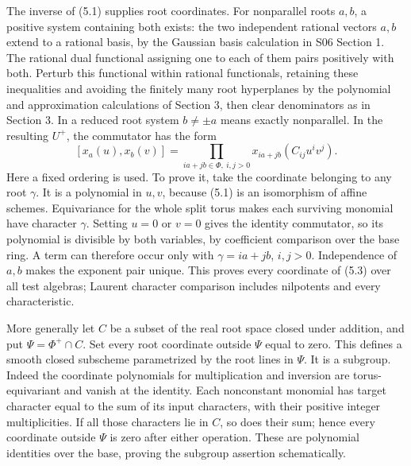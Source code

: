 \documentclass[11pt,a4paper,openany]{report}
\begin{document}
The inverse of (5.1) supplies root coordinates. For nonparallel roots \(a,b\), a positive system containing both exists: the two independent rational vectors \(a,b\) extend to a rational basis, by the Gaussian basis calculation in S06 Section 1. The rational dual functional assigning one to each of them pairs positively with both. Perturb this functional within rational functionals, retaining these inequalities and avoiding the finitely many root hyperplanes by the polynomial and approximation calculations of Section 3, then clear denominators as in Section 3. In a reduced root system \(b\ne\pm a\) means exactly nonparallel. In the resulting \(U^+\), the commutator has the form \[
 [x_a(u),x_b(v)]
       =\prod_{ia+jb\in\Phi,\ i,j>0}
                          x_{ia+jb}(C_{ij}u^iv^j).
\tag{5.3}
\] Here a fixed ordering is used. To prove it, take the coordinate belonging to any root \(\gamma\). It is a polynomial in \(u,v\), because (5.1) is an isomorphism of affine schemes. Equivariance for the whole split torus makes each surviving monomial have character \(\gamma\). Setting \(u=0\) or \(v=0\) gives the identity commutator, so its polynomial is divisible by both variables, by coefficient comparison over the base ring. A term can therefore occur only with \(\gamma=ia+jb\), \(i,j>0\). Independence of \(a,b\) makes the exponent pair unique. This proves every coordinate of (5.3) over all test algebras; Laurent character comparison includes nilpotents and every characteristic.

More generally let \(C\) be a subset of the real root space closed under addition, and put \(\Psi=\Phi^+\cap C\). Set every root coordinate outside \(\Psi\) equal to zero. This defines a smooth closed subscheme parametrized by the root lines in \(\Psi\). It is a subgroup. Indeed the coordinate polynomials for multiplication and inversion are torus-equivariant and vanish at the identity. Each nonconstant monomial has target character equal to the sum of its input characters, with their positive integer multiplicities. If all those characters lie in \(C\), so does their sum; hence every coordinate outside \(\Psi\) is zero after either operation. These are polynomial identities over the base, proving the subgroup assertion schematically.
\end{document}
